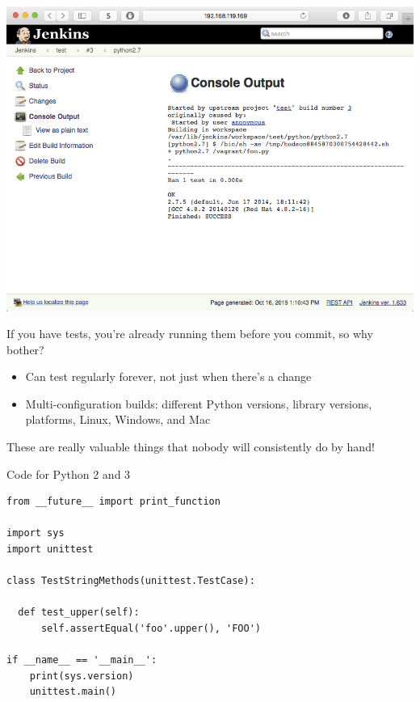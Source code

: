 \documentclass[xcolor=svgnames,17pt]{beamer}
\newcommand*{\sizefont}[1]{%
    \ifcase#1\relax
    \or \tiny
    \or \scriptsize
    \or \footnotesize
    \or \small
    \or \normalsize
    \or \large
    \or \Large
    \or \LARGE
    \or \huge
    \or \Huge
    \fi}
\begin{document}
\begin{frame}[plain]{}
\includegraphics[width=\paperwidth,frame,center]{hello-6-output-1.png}
\end{frame}

\begin{frame}{}
If you have tests, you’re already running them before you commit, so why
bother?
\pause
\begin{itemize}
\item Can test regularly forever, not just when there’s a change
\pause
\item Multi-configuration builds: different Python versions, library
versions, platforms, Linux, Windows, and Mac
\end{itemize}
\pause
\alert{These are really valuable things that nobody will consistently do by
hand!}
\end{frame}

\begin{frame}[fragile]{Code for Python 2 and 3}
\sizefont{2}
\begin{verbatim}
from __future__ import print_function

import sys
import unittest

class TestStringMethods(unittest.TestCase):

  def test_upper(self):
      self.assertEqual('foo'.upper(), 'FOO')

if __name__ == '__main__':
    print(sys.version)
    unittest.main()
\end{verbatim}
\end{frame}
\end{document}
